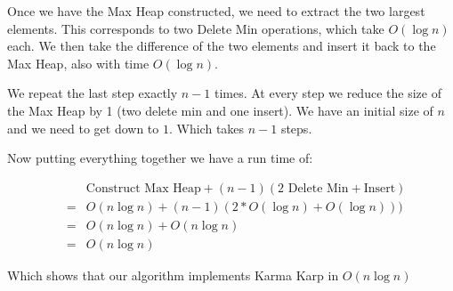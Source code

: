 \documentclass[11pt]{article}
\begin{document}
Once we have the Max Heap constructed, we need to extract the two largest elements. This corresponds to two Delete Min operations, which take $O(\log n)$ each. We then take the difference of the two elements and insert it back to the Max Heap, also with time $O(\log n)$.

We repeat the last step exactly $n-1$ times. At every step we reduce the size of the Max Heap by 1 (two delete min and one insert). We have an initial size of $n$ and we need to get down to $1$. Which takes $n-1$ steps.

Now putting everything together we have a run time of:

\begin{eqnarray}
&&\text{Construct Max Heap} + (n-1)(\text{2 Delete Min}+\text{Insert})\\
&=& O(n \log n)+(n-1)(2*O(\log n)+O(\log n)))\\
&=& O(n\log n) + O(n\log n)\\
&=& \boxed{O(n\log n)}
\end{eqnarray}

Which shows that our algorithm implements Karma Karp in $O(n\log n)$
\end{document}
